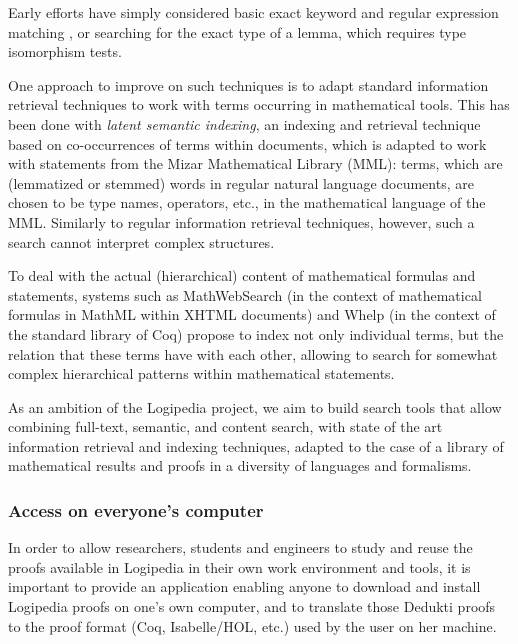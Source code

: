 Early efforts have simply considered
basic exact keyword and regular expression matching 
\cite{DBLP:conf/mkm/BancerekR03}, or searching for the exact type of a lemma,
which requires type isomorphism tests\cite{DBLP:conf/types/Delahaye99}.

One approach to improve on such techniques is to
adapt standard information retrieval techniques to work with terms
occurring in mathematical tools. This has been done\cite{DBLP:conf/mkm/Cairns04}
with \emph{latent semantic indexing}, an
indexing and retrieval technique based on co-occurrences of terms within
documents, which is adapted to work with statements from the Mizar
Mathematical Library (MML): terms, which are (lemmatized or stemmed)
words in regular natural language documents, are chosen to be type names,
operators, etc., in the mathematical language of the MML. Similarly to
regular information retrieval techniques, however, such a search cannot
interpret complex structures.

To deal with the actual (hierarchical) content of mathematical formulas
and statements, systems such as
MathWebSearch\cite{DBLP:conf/aisc/KohlhaseMP12} (in the context of
mathematical formulas in MathML within XHTML documents) and
Whelp\cite{DBLP:conf/types/AspertiGCTZ04} (in the context of the standard
library of Coq) propose to index not only individual terms, but the
relation that these terms have with each other, allowing to search for
somewhat complex hierarchical patterns within mathematical statements.

As an ambition of the Logipedia project, we aim to build search tools that allow
combining full-text, semantic, and content search, with state of the art
information retrieval and indexing techniques, adapted to the case of
a library of mathematical results and proofs in a diversity of languages
and formalisms.

\subsubsection*{Access on everyone's computer}

In order to allow researchers, students and engineers to study and
reuse the proofs available in Logipedia in their own work environment
and tools, it is important to provide an application enabling anyone
to download and install Logipedia proofs on one's own computer, and to
translate those Dedukti proofs to the proof format (Coq, Isabelle/HOL,
etc.) used by the user on her machine.


